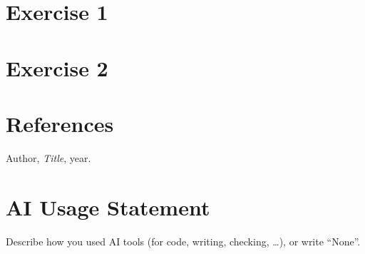 \documentclass[10pt]{article}
\begin{document}

\section{Exercise 1}

\clearpage
\section{Exercise 2}

\clearpage
\section*{References}
\begin{enumerate}[label={[\arabic*]}]
\item Author, \emph{Title}, year.
\end{enumerate}

\section*{AI Usage Statement}
Describe how you used AI tools (for code, writing, checking, \dots), or write ``None''.
\end{document}
